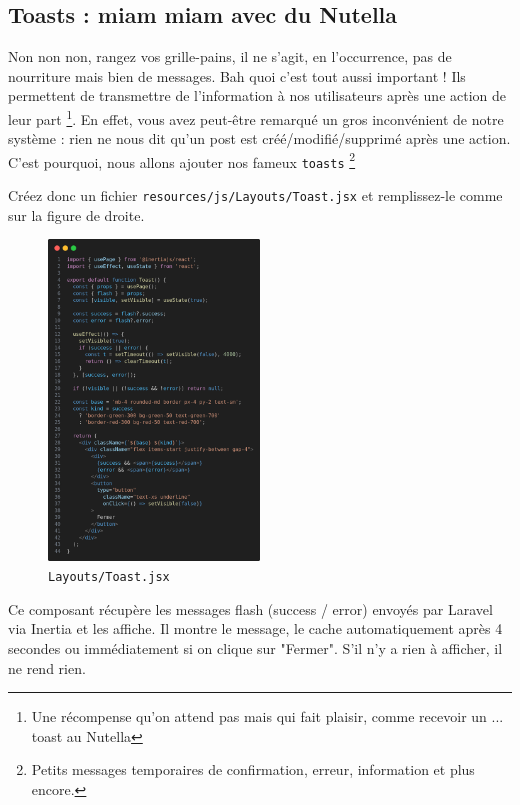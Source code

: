 \subsection{Toasts : miam miam avec du Nutella}\label{sec:messages}
Non non non, rangez vos grille-pains, il ne s'agit, en l'occurrence, pas de nourriture mais bien de messages. Bah quoi c'est tout aussi important ! Ils permettent de transmettre de l'information à nos utilisateurs après une action de leur part \footnote{Une récompense qu'on attend pas mais qui fait plaisir, comme recevoir un ... toast au Nutella}. En effet, vous avez peut-être remarqué un gros inconvénient de notre système : rien ne nous dit qu'un post est créé/modifié/supprimé après une action. C'est pourquoi, nous allons ajouter nos fameux \texttt{toasts} \footnote{Petits messages temporaires de confirmation, erreur, information et plus encore.}

Créez donc un fichier \verb|resources/js/Layouts/Toast.jsx| et remplissez-le comme sur la figure de droite.


\begin{figure}
    \vspace{-0.5cm}
    \includegraphics[width=0.5\textwidth]{figures-C1/posts_toast.png}    
    \captionsetup{singlelinecheck=true}   
    \caption{\texttt{Layouts/Toast.jsx}}
    \label{fig:posts_toast}
\end{figure}
Ce composant récupère les messages flash (success / error) envoyés par Laravel via Inertia et les affiche. Il montre le message, le cache automatiquement après 4 secondes ou immédiatement si on clique sur "Fermer". S’il n’y a rien à afficher, il ne rend rien.

